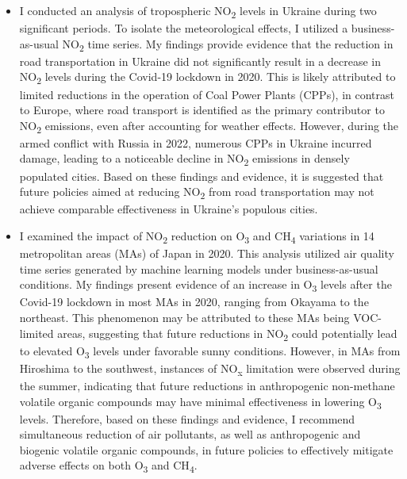 \begin{itemize}
    \item I conducted an analysis of tropospheric NO\textsubscript{2} levels in Ukraine during two significant periods. To isolate the meteorological effects, I utilized a business-as-usual NO\textsubscript{2} time series. My findings provide evidence that the reduction in road transportation in Ukraine did not significantly result in a decrease in NO\textsubscript{2} levels during the Covid-19 lockdown in 2020. This is likely attributed to limited reductions in the operation of Coal Power Plants (CPPs), in contrast to Europe, where road transport is identified as the primary contributor to NO\textsubscript{2} emissions, even after accounting for weather effects. However, during the armed conflict with Russia in 2022, numerous CPPs in Ukraine incurred damage, leading to a noticeable decline in NO\textsubscript{2} emissions in densely populated cities. Based on these findings and evidence, it is suggested that future policies aimed at reducing NO\textsubscript{2} from road transportation may not achieve comparable effectiveness in Ukraine's populous cities.
    \item I examined the impact of NO\textsubscript{2} reduction on O\textsubscript{3} and CH\textsubscript{4} variations in 14 metropolitan areas (MAs) of Japan in 2020. This analysis utilized air quality time series generated by machine learning models under business-as-usual conditions. My findings present evidence of an increase in O\textsubscript{3} levels after the Covid-19 lockdown in most MAs in 2020, ranging from Okayama to the northeast. This phenomenon may be attributed to these MAs being VOC-limited areas, suggesting that future reductions in NO\textsubscript{2} could potentially lead to elevated O\textsubscript{3} levels under favorable sunny conditions. However, in MAs from Hiroshima to the southwest, instances of NO\textsubscript{x} limitation were observed during the summer, indicating that future reductions in anthropogenic non-methane volatile organic compounds may have minimal effectiveness in lowering O\textsubscript{3} levels. Therefore, based on these findings and evidence, I recommend simultaneous reduction of air pollutants, as well as anthropogenic and biogenic volatile organic compounds, in future policies to effectively mitigate adverse effects on both O\textsubscript{3} and CH\textsubscript{4}.

\end{itemize}
